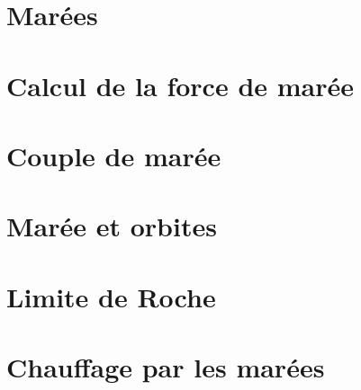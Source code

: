 \documentclass[a4paper,DIV16,10pt]{scrartcl}
\begin{document}
 \inidoc



\newpage
\section{Marées}


\newpage
\section{Calcul de la force de marée}


\newpage
\section{Couple de marée}


\newpage
\section{Marée et orbites}


\newpage
\section{Limite de Roche}


\newpage
\section{Chauffage par les marées}


%

%

%
\end{document}
